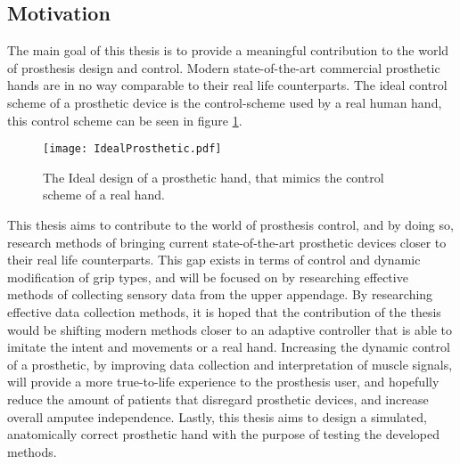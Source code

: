 \documentclass[../main.tex]{subfiles}
\begin{document}
\subsection{Motivation}

The main goal of this thesis is to provide a meaningful contribution to the world of prosthesis design and control.
Modern state-of-the-art commercial prosthetic hands are in no way comparable to their real life counterparts.
The ideal control scheme of a prosthetic device is the control-scheme used by a real human hand, this control scheme can be seen in figure \ref{fig:idealprosthetic}.

\begin{figure}[h]
\begin{center}
\texttt{[image: IdealProsthetic.pdf]}
\caption{The Ideal design of a prosthetic hand, that mimics the control scheme of a real hand.}
\label{fig:idealprosthetic}
\end{center}
\end{figure}


This thesis aims to contribute to the world of prosthesis control, and by doing so, research methods of bringing current state-of-the-art prosthetic devices closer to their real life counterparts.
This gap exists in terms of control and dynamic modification of grip types, and will be focused on by researching effective methods of collecting sensory data from the upper appendage.
By researching effective data collection methods, it is hoped that the contribution of the thesis would be shifting modern methods closer to an adaptive controller that is able to imitate the intent and movements or a real hand.
Increasing the dynamic control of a prosthetic, by improving data collection and interpretation of  muscle signals, will provide a more true-to-life experience to the prosthesis user, and hopefully reduce the amount of patients that disregard prosthetic devices, and increase overall amputee independence.
Lastly, this thesis aims to design a simulated, anatomically correct prosthetic hand with the purpose of testing the developed methods.
\end{document}

